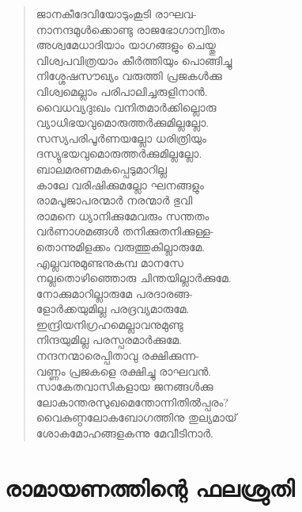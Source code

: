 \begin{verse}
ജാനകീദേവിയോടുംകൂടി രാഘവ-\\
നാനന്ദമുള്‍ക്കൊണ്ടു രാജഭോഗാന്വിതം\\
അശ്വമേധാദിയാം യാഗങ്ങളും ചെയ്തു\\
വിശ്വപവിത്രയാം കീര്‍ത്തിയും പൊങ്ങിച്ചു\\
നിശ്ശേഷസൗഖ്യം വരുത്തി പ്രജകള്‍ക്കു\\
വിശ്വമെല്ലാം പരിപാലിച്ചരുളിനാന്‍.\\
വൈധവ്യദുഃഖം വനിതമാര്‍ക്കില്ലൊരു\\
വ്യാധിഭയവുമൊരുത്തര്‍ക്കുമില്ലല്ലോ.\\
സസ്യപരിപൂര്‍ണയല്ലോ ധരിത്രിയും\\
ദസ്യുഭയവുമൊരുത്തര്‍ക്കുമില്ലല്ലോ.\\
ബാലമരണമകപ്പെടുമാറില്ല\\
കാലേ വരിഷിക്കുമല്ലോ ഘനങ്ങളും\\
രാമപൂജാപരന്മാര്‍ നരന്മാര്‍ ഭുവി\\
രാമനെ ധ്യാനിക്കുമേവരും സന്തതം\\
വര്‍ണാശമങ്ങള്‍ തനിക്കുതനിക്കുള്ള-\\
തൊന്നുമിളക്കം വരുത്തുകില്ലാരുമേ.\\
എല്ലവനുമുണ്ടനുകമ്പ മാനസേ\\
നല്ലതൊഴിഞ്ഞൊരു ചിന്തയില്ലാര്‍ക്കുമേ.\\
നോക്കുമാറില്ലാരുമേ പരദാരങ്ങ-\\
ളോര്‍ക്കയുമില്ല പരദ്രവ്യമാരുമേ.\\
ഇന്ദ്രിയനിഗ്രഹമെല്ലാവനുമുണ്ടു\\
നിന്ദയുമില്ല പരസ്പരമാര്‍ക്കുമേ.\\
നന്ദനന്മാരെപ്പിതാവു രക്ഷിക്കുന്ന-\\
വണ്ണം പ്രജകളെ രക്ഷിച്ചു രാഘവന്‍.\\
സാകേതവാസികളായ ജനങ്ങള്‍ക്കു\\
ലോകാന്തരസുഖമെന്തോന്നിതില്‍പ്പരം?\\
വൈകുണ്ഠലോകബോഗത്തിനു തുല്യമായ്\\
ശോകമോഹങ്ങളകന്നു മേവീടിനാര്‍.
\end{verse}

\newpage

\section{രാമായണത്തിന്റെ ഫലശ്രുതി}

